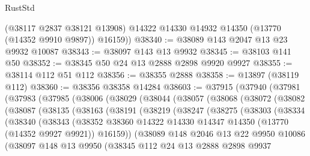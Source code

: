\begin{lexlean}{RustStd}
\begin{coremodule}
        (@38117 @2837 @38121 @13908)
        @14322
        @14330
        @14932
        @14350
        (@13770 (@14352 @9910 @9897))
        @16159))
@38340 := @38089 @143 @2047 @13 @23 @9932 @10087
@38343 := @38097 @143 @13 @9932
@38345 := @38103 @141 @50
@38352 := @38345 @50 @24 @13 @2888 @2898 @9920 @9927
@38355 := @38114 @112 @51 @112
@38356 := @38355 @2888
@38358 := @13897 (@38119 @112)
@38360 := @38356 @38358 @14284
@38603 := @37915
    (@37940
      (@37981
        (@37983
          (@37985
            (@38006
              (@38029
                (@38044
                  (@38057
                    (@38068
                      (@38072
                        (@38082
                          (@38087
                            (@38135
                              (@38163
                                (@38191
                                  (@38219
                                    (@38247
                                      (@38275
                                        (@38303
                                          (@38334
                                            (@38340
                                              (@38343
                                                (@38352
                                                  @38360
                                                  @14322
                                                  @14330
                                                  @14347
                                                  @14350
                                                  (@13770 (@14352 @9927 @9921))
                                                  @16159))
                                              (@38089
                                                @148
                                                @2046
                                                @13
                                                @22
                                                @9950
                                                @10086
                                                (@38097
                                                  @148
                                                  @13
                                                  @9950
                                                  (@38345
                                                    @112
                                                    @24
                                                    @13
                                                    @2888
                                                    @2898
                                                    @9937

\end{coremodule}
\end{lexlean}
